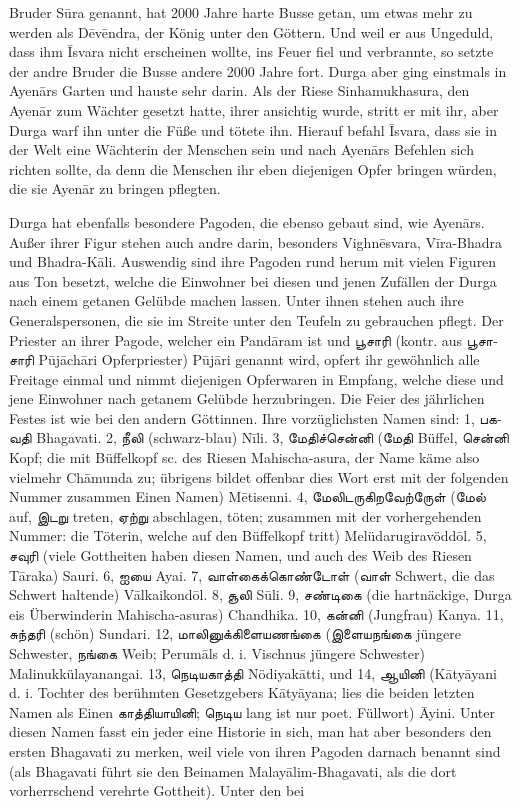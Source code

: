 \documentclass{article}
\newcommand{\TamilText}[1]{\texttamil{#1}}
\newcommand{\tam}[1]{\TamilText{#1}}
\begin{document}
Bruder S\={u}ra genannt, hat 2000 Jahre harte Busse getan, um etwas mehr zu werden als D\={e}v\={e}ndra, der König unter den Göttern. Und weil er aus Ungeduld, dass ihm \={I}svara nicht erscheinen wollte, ins Feuer fiel und verbrannte, so setzte der andre Bruder die Busse andere 2000 Jahre fort. Durga aber ging einstmals in Ayen\={a}rs Garten und hauste sehr darin. Als der Riese Sinhamukhasura, den Ayen\={a}r zum Wächter gesetzt hatte, ihrer ansichtig wurde, stritt er mit ihr, aber Durga warf ihn unter die Füße und tötete ihn. Hierauf befahl \={I}svara, dass sie in der Welt eine Wächterin der Menschen sein und nach Ayen\={a}rs Befehlen sich richten sollte, da denn die Menschen ihr eben diejenigen Opfer bringen würden, die sie Ayen\={a}r zu bringen pflegten.

Durga hat ebenfalls besondere Pagoden, die ebenso gebaut sind, wie Ayen\={a}rs. Außer ihrer Figur stehen auch andre darin, besonders Vighn\={e}svara, V\={i}ra-Bhadra und Bhadra-K\={a}li. Auswendig sind ihre Pagoden rund herum mit vielen Figuren aus Ton besetzt, welche die Einwohner bei diesen und jenen Zufällen der Durga nach einem getanen Gelübde machen lassen. Unter ihnen stehen auch ihre Generalspersonen, die sie im Streite unter den Teufeln zu gebrauchen pflegt. Der Priester an ihrer Pagode, welcher ein Pand\={a}ram ist und \tam{பூசாரி} (kontr. aus \tam{பூசாசாரி} P\={u}j\={a}ch\={a}ri Opferpriester) P\={u}j\={a}ri genannt wird, opfert ihr gewöhnlich alle Freitage einmal und nimmt diejenigen Opferwaren in Empfang, welche diese und jene Einwohner nach getanem Gelübde herzubringen. Die Feier des jährlichen Festes ist wie bei den andern Göttinnen. Ihre vorzüglichsten Namen sind: 1, \tam{பகவதி} Bhagavati. 2, \tam{நீலி} (schwarz-blau) N\={i}li. 3, \tam{மேதிச்சென்னி} (\tam{மேதி} Büffel, \tam{சென்னி} Kopf; die mit Büffelkopf sc. des Riesen Mahischa-asura, der Name käme also vielmehr Ch\={a}munda zu; übrigens bildet offenbar dies Wort erst mit der folgenden Nummer zusammen Einen Namen) M\={e}tisenni. 4, \tam{மேலிடருகிறவேற்ருேள்} (\tam{மேல்} auf, \tam{இடறு} treten, \tam{ஏற்று} abschlagen, töten; zusammen mit der vorhergehenden Nummer: die Töterin, welche auf den Büffelkopf tritt) Melüdarugiravödd\={o}l. 5, \tam{சவுரி} (viele Gottheiten haben diesen Namen, und auch des Weib des Riesen T\={a}raka) Sauri. 6, \tam{ஐயை} Ayai. 7, \tam{வாள்கைக்கொண்டோள்} (\tam{வாள்} Schwert, die das Schwert haltende) V\={a}lkaikond\={o}l. 8, \tam{சூலி} S\={u}li. 9, \tam{சண்டிகை} (die hartnäckige, Durga eis Überwinderin Mahischa-asuras) Chandhika. 10, \tam{கன்னி} (Jungfrau) Kanya. 11, \tam{சுந்தரி} (schön) Sundari. 12, \tam{மாலினுக்கிளையணங்கை} (\tam{இளையநங்கை} jüngere Schwester, \tam{நங்கை} Weib; Perum\={a}ls d. i. Vischnus jüngere Schwester) Malinukkülayanangai. 13, \tam{நெடியகாத்தி} Nödiyak\={a}tti, und 14, \tam{ஆயினி} (K\={a}ty\={a}yani d. i. Tochter des berühmten Gesetzgebers K\={a}ty\={a}yana; lies die beiden letzten Namen als Einen \tam{காத்தியாயினி}; \tam{நெடிய} lang ist nur poet. Füllwort) \={A}yini. Unter diesen Namen fasst ein jeder eine Historie in sich, man hat aber besonders den ersten Bhagavati zu merken, weil viele von ihren Pagoden darnach benannt sind (als Bhagavati führt sie den Beinamen Malay\={a}lim-Bhagavati, als die dort vorherrschend verehrte Gottheit). Unter den bei 
\end{document}
